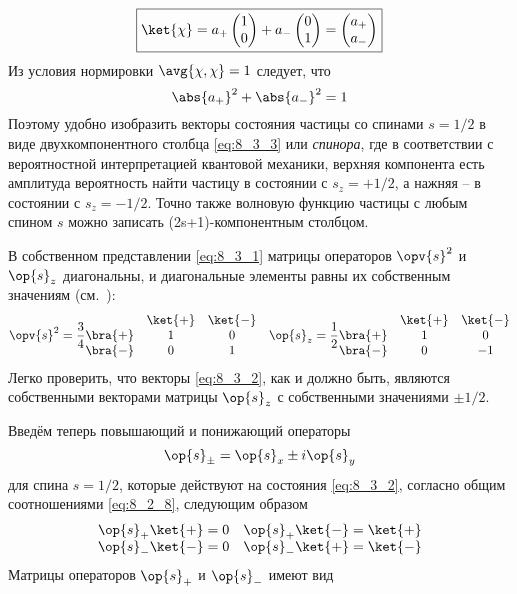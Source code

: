 \begin{equation}
\label{eq:8_3_3}
\boxed{
	\ket{\chi} = a_{+} \begin{pmatrix} 1 \\ 0 \end{pmatrix} + a_{-} \begin{pmatrix} 0 \\ 1 \end{pmatrix} = \begin{pmatrix} a_{+} \\ a_{-} \end{pmatrix}
}
\end{equation}%
%
Из условия нормировки $\avg{\chi, \chi} = 1$ следует, что 
$$
\abs{a_{+}}^2 + \abs{a_{-}}^2 = 1
$$%
%
Поэтому удобно изобразить векторы состояния частицы со спинами $s=1/2$ в виде двухкомпонентного столбца \eqref{eq:8_3_3} или {\em спинора}, где в соответствии с вероятностной интерпретацией квантовой механики, верхняя компонента есть амплитуда вероятность найти частицу в состоянии с $s_z = +1/2$, а нажняя -- в состоянии с $s_z = -1/2$. Точно также волновую функцию частицы с любым спином $s$ можно записать (2s+1)-компонентным столбцом.

В собственном представлении \eqref{eq:8_3_1} матрицы операторов $\opv{s}^2$ и $\op{s}_z$ диагональны, и диагональные элементы равны их собственным значениям (см.~):
\begin{equation}
\label{eq:8_3_4}
\opv{s}^2 = \frac{3}{4}
\begin{matrix}
            & \ket{+} & \ket{-} \\
\bra{+} &  1         & 0         \\
\bra{-}  &  0         & 1         
\end{matrix}
~~~\op{s}_z = \frac{1}{2}
\begin{matrix}
            & \ket{+} & \ket{-} \\
\bra{+} &  1         & 0         \\
\bra{-}  &  0         & -1         
\end{matrix}
\end{equation}%
%
Легко проверить, что векторы \eqref{eq:8_3_2}, как и должно быть, являются собственными векторами матрицы $\op{s}_z$ с собственными значениями $\pm 1/2$.

Введём теперь повышающий и понижающий операторы
$$
\op{s}_{\pm} = \op{s}_x \pm i\op{s}_y
$$%
%
для спина $s=1/2$, которые действуют на состояния \eqref{eq:8_3_2}, согласно общим соотношениями \eqref{eq:8_2_8}, следующим образом
$$
\begin{matrix}
\op{s}_{+}\ket{+} = 0 & \op{s}_{+}\ket{-} = \ket{+} \\
\op{s}_{-}\ket{-} = 0 &  \op{s}_{-}\ket{+} = \ket{-}
\end{matrix}
$$%
%
Матрицы операторов $\op{s}_{+}$ и $\op{s}_{-}$ имеют вид

